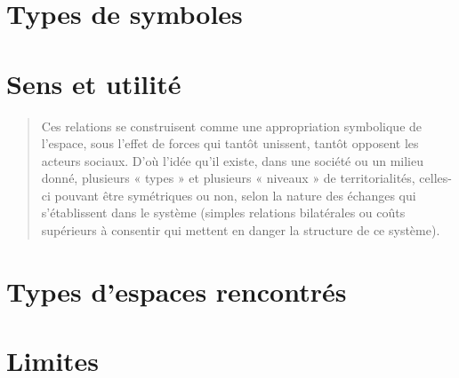 \section*{Types de symboles}
\label{sec:types_de_symboles}


\section*{Sens et utilité}
\label{sec:sens_et_utilit_}
\begin{quotation}
  Ces relations se construisent comme une appropriation symbolique de l'espace, sous l'effet de forces qui tantôt unissent, tantôt opposent les acteurs sociaux.
  D'où l'idée qu'il existe, dans une société ou un milieu donné, plusieurs « types » et plusieurs « niveaux » de territorialités, celles-ci pouvant être symétriques ou non, selon la nature des échanges qui s'établissent dans le système (simples relations bilatérales ou coûts supérieurs à consentir qui mettent en danger la structure de ce système).\citep[41]{Courville1991}
\end{quotation}

\section*{Types d'espaces rencontrés}
\label{sec:types_d_espaces_rencontr_s}

\section{Limites}
\label{sec:limites}


